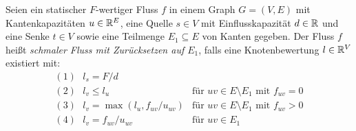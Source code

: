 \begin{definition}
	Seien ein statischer $F$-wertiger Fluss $f$ in einem Graph $G=(V,E)$ mit Kantenkapazitäten $u\in\mathbb{R}^E$, eine Quelle $s\in V$ mit Einflusskapazität $d\in\mathbb{R}$ und eine Senke $t\in V$ sowie eine Teilmenge $E_1\subseteq E$ von Kanten gegeben.
	Der Fluss $f$ heißt \emph{schmaler Fluss mit Zurücksetzen auf $E_1$}, falls eine Knotenbewertung $l\in\mathbb{R}^V$ existiert mit:
	$$\begin{array}{ll}
	(1)~~~	l_s = F/d& \\
	(2)~~~	l_v \leq l_u &\text{für $uv\in E \setminus E_1$ mit $f_{uv}=0$}\\
	(3)~~~	l_v = \max(l_u, f_{uv} / u_{uv} ) &\text{für $uv\in E\setminus E_1$ mit $f_{uv} > 0$}\\
	(4)~~~	l_v = f_{uv} / u_{uv} & \text{für $uv\in E_1$}
	\end{array}$$
\end{definition}

